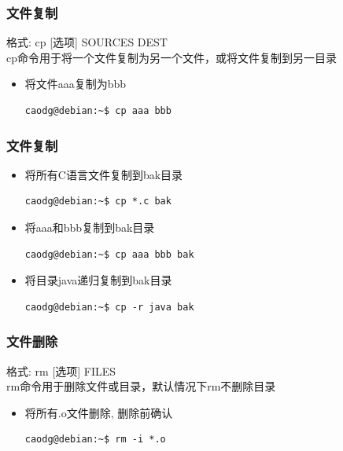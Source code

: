 \documentclass[compress]{beamer}
\begin{document}
\begin{frame}[containsverbatim]
\frametitle{文件复制}

格式: \alert{cp} [选项] SOURCES \quad DEST \\
\alert{cp}命令用于将一个文件复制为另一个文件，或将文件复制到另一目录

\begin{itemize}
\item 将文件aaa复制为bbb\\
\begin{Verbatim}
caodg@debian:~$ cp aaa bbb
\end{Verbatim}

\end{itemize}

\end{frame}

\begin{frame}[containsverbatim]
  \frametitle{文件复制}
  
  \begin{itemize}
\item 将所有C语言文件复制到bak目录\\
\begin{Verbatim}
caodg@debian:~$ cp *.c bak
\end{Verbatim}

\item 将aaa和bbb复制到bak目录\\
\begin{Verbatim}
caodg@debian:~$ cp aaa bbb bak
\end{Verbatim}

\item 将目录java递归复制到bak目录\\
\begin{Verbatim}
caodg@debian:~$ cp -r java bak
\end{Verbatim}

\end{itemize}

\end{frame}


\begin{frame}[containsverbatim]
\frametitle{文件删除}

格式: \alert{rm} [选项] FILES \\
\alert{rm}命令用于删除文件或目录，默认情况下\alert{rm}不删除目录

\begin{itemize}
\item 将所有.o文件删除, 删除前确认\\
\begin{Verbatim}
caodg@debian:~$ rm -i *.o
\end{Verbatim}

\end{itemize}

\end{frame}
\end{document}
